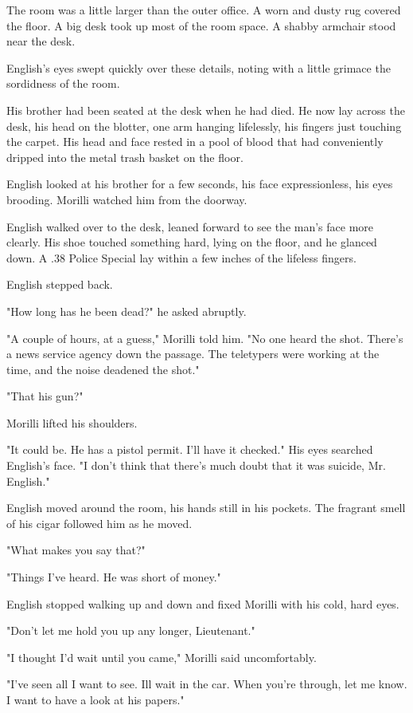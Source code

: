 \documentclass{novel}
\begin{document}
The room was a little larger than the outer office. A worn and dusty rug covered the floor. A big desk took up most of the room space. A shabby armchair stood near the desk.

English's eyes swept quickly over these details, noting with a little grimace the sordidness of the room.

His brother had been seated at the desk when he had died. He now lay across the desk, his head on the blotter, one arm hanging lifelessly, his fingers just touching the carpet. His head and face rested in a pool of blood that had conveniently dripped into the metal trash basket on the floor.

English looked at his brother for a few seconds, his face expressionless, his eyes brooding. Morilli watched him from the doorway.

English walked over to the desk, leaned forward to see the man's face more clearly. His shoe touched something hard, lying on the floor, and he glanced down. A .38 Police Special lay within a few inches of the lifeless fingers.

English stepped back.

"How long has he been dead?" he asked abruptly.

"A couple of hours, at a guess," Morilli told him. "No one heard the shot. There's a news service agency down the passage. The teletypers were working at the time, and the noise deadened the shot."

"That his gun?"

Morilli lifted his shoulders.

"It could be. He has a pistol permit. I'll have it checked." His eyes searched English's face. "I don't think that there's much doubt that it was suicide, Mr. English."

English moved around the room, his hands still in his pockets. The fragrant smell of his cigar followed him as he moved.

"What makes you say that?"

"Things I've heard. He was short of money."

English stopped walking up and down and fixed Morilli with his cold, hard eyes.

"Don't let me hold you up any longer, Lieutenant."

"I thought I'd wait until you came," Morilli said uncomfortably.

"I've seen all I want to see. Ill wait in the car. When you're through, let me know. I want to have a look at his papers."
\end{document}
